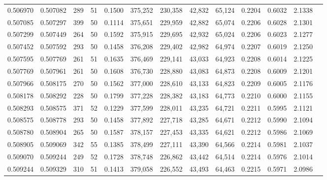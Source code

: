 \begin{tabular}{rrrrrrrrrrrrr}
0.506970 & 0.507082 &   289 &  51 &                                     0.1500 & 375,252 & 230,358 &  42,832 &  65,124 & 0.2204 & 0.6032 & 2.1338 \\
0.507085 & 0.507297 &   399 &  50 &                                     0.1114 & 375,651 & 229,959 &  42,882 &  65,074 & 0.2206 & 0.6028 & 2.1301 \\
0.507299 & 0.507449 &   264 &  50 &                                     0.1592 & 375,915 & 229,695 &  42,932 &  65,024 & 0.2206 & 0.6023 & 2.1277 \\
0.507452 & 0.507592 &   293 &  50 &                                     0.1458 & 376,208 & 229,402 &  42,982 &  64,974 & 0.2207 & 0.6019 & 2.1250 \\
0.507595 & 0.507769 &   261 &  51 &                                     0.1635 & 376,469 & 229,141 &  43,033 &  64,923 & 0.2208 & 0.6014 & 2.1225 \\
0.507769 & 0.507961 &   261 &  50 &                                     0.1608 & 376,730 & 228,880 &  43,083 &  64,873 & 0.2208 & 0.6009 & 2.1201 \\
0.507966 & 0.508175 &   270 &  50 &                                     0.1562 & 377,000 & 228,610 &  43,133 &  64,823 & 0.2209 & 0.6005 & 2.1176 \\
0.508178 & 0.508292 &   228 &  50 &                                     0.1799 & 377,228 & 228,382 &  43,183 &  64,773 & 0.2210 & 0.6000 & 2.1155 \\
0.508293 & 0.508575 &   371 &  52 &                                     0.1229 & 377,599 & 228,011 &  43,235 &  64,721 & 0.2211 & 0.5995 & 2.1121 \\
0.508575 & 0.508778 &   293 &  50 &                                     0.1458 & 377,892 & 227,718 &  43,285 &  64,671 & 0.2212 & 0.5990 & 2.1094 \\
0.508780 & 0.508904 &   265 &  50 &                                     0.1587 & 378,157 & 227,453 &  43,335 &  64,621 & 0.2212 & 0.5986 & 2.1069 \\
0.508905 & 0.509069 &   342 &  55 &                                     0.1385 & 378,499 & 227,111 &  43,390 &  64,566 & 0.2214 & 0.5981 & 2.1037 \\
0.509070 & 0.509244 &   249 &  52 &                                     0.1728 & 378,748 & 226,862 &  43,442 &  64,514 & 0.2214 & 0.5976 & 2.1014 \\
0.509244 & 0.509329 &   310 &  51 &                                     0.1413 & 379,058 & 226,552 &  43,493 &  64,463 & 0.2215 & 0.5971 & 2.0986 \\

\end{tabular}
